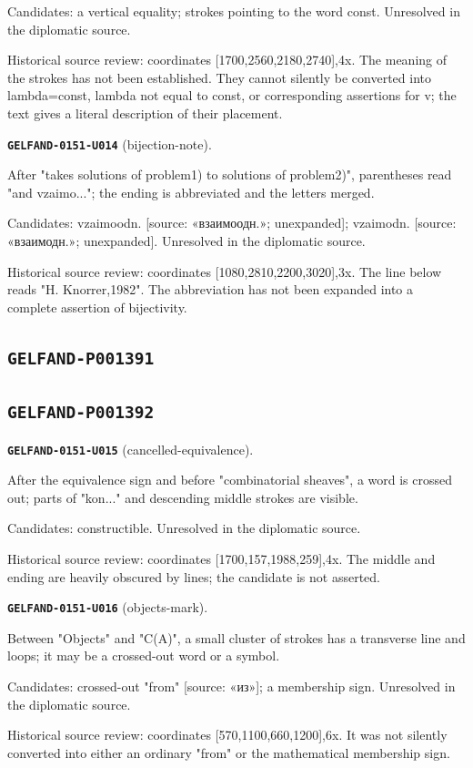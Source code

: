 Candidates: a vertical equality; strokes pointing to the word const. Unresolved in the diplomatic source.\par
Historical source review: coordinates [1700,2560,2180,2740],4x. The meaning of the strokes has not been established. They cannot silently be converted into lambda=const, lambda not equal to const, or corresponding assertions for v; the text gives a literal description of their placement.\par
\medskip
\par\noindent\leavevmode{}\label{GELFAND-0151-U014}\textbf{\texttt{GELFAND-0151-U014}} (bijection-note).\nopagebreak[4]\par
After "takes solutions of problem1) to solutions of problem2)", parentheses read "and vzaimo..."; the ending is abbreviated and the letters merged.\par
Candidates: vzaimoodn. [source: «взаимоодн.»; unexpanded]; vzaimodn. [source: «взаимодн.»; unexpanded]. Unresolved in the diplomatic source.\par
Historical source review: coordinates [1080,2810,2200,3020],3x. The line below reads "H. Knorrer,1982". The abbreviation has not been expanded into a complete assertion of bijectivity.\par
\medskip
\subsection*{\texttt{GELFAND-P001391}}
\subsection*{\texttt{GELFAND-P001392}}
\par\noindent\leavevmode{}\label{GELFAND-0151-U015}\textbf{\texttt{GELFAND-0151-U015}} (cancelled-equivalence).\nopagebreak[4]\par
After the equivalence sign and before "combinatorial sheaves", a word is crossed out; parts of "kon..." and descending middle strokes are visible.\par
Candidates: constructible. Unresolved in the diplomatic source.\par
Historical source review: coordinates [1700,157,1988,259],4x. The middle and ending are heavily obscured by lines; the candidate is not asserted.\par
\medskip
\par\noindent\leavevmode{}\label{GELFAND-0151-U016}\textbf{\texttt{GELFAND-0151-U016}} (objects-mark).\nopagebreak[4]\par
Between "Objects" and "C(A)", a small cluster of strokes has a transverse line and loops; it may be a crossed-out word or a symbol.\par
Candidates: crossed-out "from" [source: «из»]; a membership sign. Unresolved in the diplomatic source.\par
Historical source review: coordinates [570,1100,660,1200],6x. It was not silently converted into either an ordinary "from" or the mathematical membership sign.\par
\medskip
